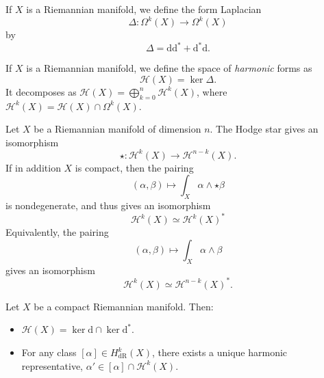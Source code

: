 \documentclass[12pt,letterpaper,reqno]{article}
\numberwithin{equation}{section}
\newcommand{\cH}{\ensuremath{\mathcal H}}
\newcommand{\de}{\mathrm{d}}
\newcommand{\dR}{\mathrm{dR}}
\newcommand{\ti}[1]{\textit{#1}}
\begin{document}
\begin{defn}
If $X$ is a Riemannian manifold, we define the form Laplacian
\begin{equation}
  \Delta: \Omega^k(X) \to \Omega^k(X)
\end{equation}
by
\begin{equation}
  \Delta = \de \de^* + \de^* \de.
\end{equation}
\end{defn}

\begin{defn}
If $X$ is a Riemannian manifold, we define the space of
\ti{harmonic} forms as
\begin{equation}
  \cH(X) = \ker \Delta.
\end{equation}
It decomposes as $\cH(X) = \bigoplus_{k=0}^n \cH^k(X)$,
where $\cH^k(X) = \cH(X) \cap \Omega^k(X)$.
\end{defn}

\begin{prop} \label{prop:poincare-duality}
Let $X$ be a Riemannian manifold of dimension $n$. 
The Hodge star gives an isomorphism
\begin{equation}
  \star: \cH^k(X) \to \cH^{n-k}(X).
\end{equation}
If in addition $X$ is compact, then the pairing
\begin{equation}
	(\alpha,\beta) \mapsto \int_X \alpha \wedge \star \beta
\end{equation}
is nondegenerate, and thus gives an isomorphism
\begin{equation}
  \cH^k(X) \simeq \cH^k(X)^*
\end{equation} 
Equivalently, the pairing
\begin{equation}
(\alpha, \beta) \mapsto \int_X \alpha \wedge \beta
\end{equation}
gives an isomorphism
\begin{equation}
	\cH^k(X) \simeq \cH^{n-k}(X)^*.
\end{equation}
\end{prop}

\begin{thm} 
\label{thm:abelian-hodge-riemannian}
Let $X$ be a compact Riemannian manifold. Then:
\begin{itemize}
\item $\cH(X) = \ker \de \cap \ker \de^*$.
\item For any class
$[\alpha] \in H^k_\dR(X)$, there exists a unique harmonic
representative, $\alpha' \in [\alpha] \cap \cH^k(X)$.
\end{itemize}
\end{thm}
\end{document}
